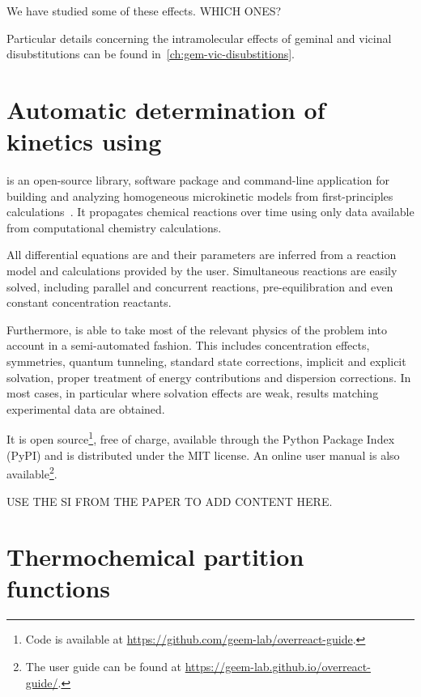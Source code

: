 We have studied some of these effects.
WHICH ONES?\@

Particular details concerning the intramolecular effects of geminal and
vicinal disubstitutions can be found in~\cref{ch:gem-vic-disubstitions}.

\section{Automatic determination of kinetics using \overreact}%
\label{sec:overreact-methods}

\overreact is an open-source library, software package and command-line
application for building and analyzing
homogeneous microkinetic models from first-principles
calculations~\cite{Schneider_2022,overreact2021zenodo}.
It propagates chemical reactions over time using only data available from
computational chemistry calculations.

All differential equations are and their parameters are inferred from a
reaction model and calculations provided by the user.
Simultaneous reactions are easily solved, including parallel and concurrent
reactions, pre-equilibration and even constant concentration reactants.

Furthermore, \overreact is able to take most of the relevant physics of the problem into
account in a semi-automated fashion.
This includes concentration effects, symmetries, quantum
tunneling, standard state corrections, implicit and explicit solvation, proper treatment
of energy contributions and dispersion corrections.
In most cases, in particular where solvation effects are weak, results matching
experimental data are obtained.

It is open source\footnote{Code is available at
	\url{https://github.com/geem-lab/overreact-guide}.}, free of charge, available through the Python Package Index (PyPI) and is
distributed under the MIT license.
An online user manual is also
available\footnote{The user guide can be found at \url{https://geem-lab.github.io/overreact-guide/}.}.

USE THE SI FROM THE PAPER TO ADD CONTENT HERE.\@

\section{Thermochemical partition functions}


